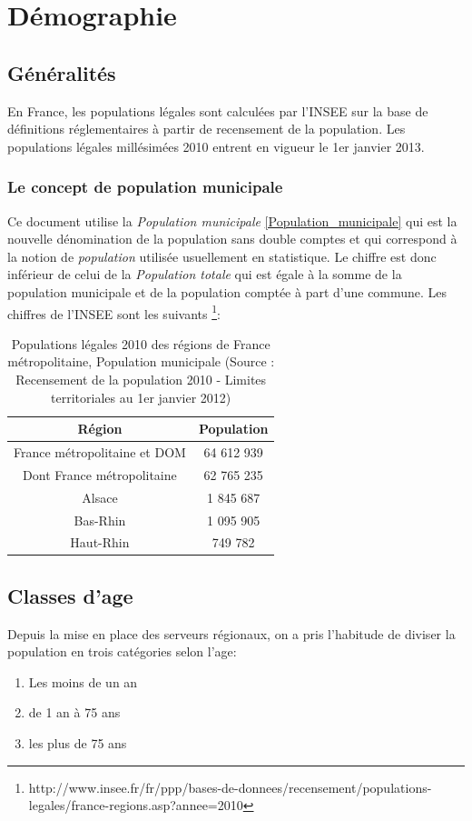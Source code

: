 \documentclass[12pt,english,french,twoside]{report}\usepackage[]{graphicx}\usepackage[]{color}
\providecommand{\tabularnewline}{\\} %
\begin{document}
\section{Démographie}
\subsection{Généralités}

En France, les populations légales sont calculées par l'INSEE sur la base de définitions réglementaires à partir de recensement de la population. 
Les populations légales millésimées 2010 entrent en vigueur le 1er janvier 2013.  

\subsubsection{Le concept de population municipale}

Ce document utilise la \emph{Population municipale} \ref{Population_municipale}   qui est la nouvelle dénomination de la population sans double comptes et qui correspond à la notion de \emph{population} utilisée usuellement en statistique.
Le chiffre est donc inférieur de celui de la \emph{Population totale} qui est égale à la somme de la population municipale et de la population comptée à part d'une commune.
Les chiffres de l'INSEE sont les suivants \footnote{http://www.insee.fr/fr/ppp/bases-de-donnees/recensement/populations-legales/france-regions.asp?annee=2010}:

\begin{table}
\begin{center}
\begin{tabular}{|c|c|}
\hline 
Région & Population\tabularnewline
\hline 
\hline 
France métropolitaine et DOM & 64 612 939\tabularnewline
\hline 
Dont France métropolitaine & 62 765 235\tabularnewline
\hline 
Alsace & 1 845 687\tabularnewline
\hline 
Bas-Rhin & 1 095 905\tabularnewline
\hline 
Haut-Rhin & 749 782\tabularnewline
\hline 
\end{tabular}
\caption[Populations légales 2010]{Populations légales 2010 des régions de France métropolitaine, Population
municipale (Source : Recensement de la population 2010 - Limites territoriales
au 1er janvier 2012) }
\label{pop2010}
\end{center}
\end{table}

\subsection{Classes d'age}
Depuis la mise en place des serveurs régionaux, on a pris l'habitude de diviser la population en trois catégories selon l'age:
\begin{enumerate}
  \item Les moins de un an
  \item de 1 an à 75 ans
  \item les plus de 75 ans
\end{enumerate}
\end{document}
